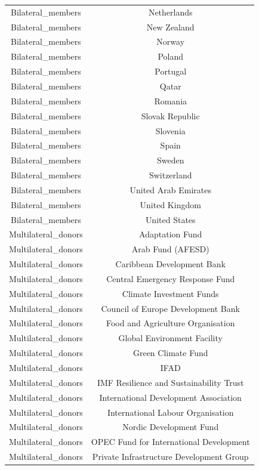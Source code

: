 \begin{longtable}{cc}
Bilateral\_members & Netherlands \\
Bilateral\_members & New Zealand \\
Bilateral\_members & Norway \\
Bilateral\_members & Poland \\
Bilateral\_members & Portugal \\
Bilateral\_members & Qatar \\
Bilateral\_members & Romania \\
Bilateral\_members & Slovak Republic \\
Bilateral\_members & Slovenia \\
Bilateral\_members & Spain \\
Bilateral\_members & Sweden \\
Bilateral\_members & Switzerland \\
Bilateral\_members & United Arab Emirates \\
Bilateral\_members & United Kingdom \\
Bilateral\_members & United States \\
Multilateral\_donors & Adaptation Fund \\
Multilateral\_donors & Arab Fund (AFESD) \\
Multilateral\_donors & Caribbean Development Bank \\
Multilateral\_donors & Central Emergency Response Fund \\
Multilateral\_donors & Climate Investment Funds \\
Multilateral\_donors & Council of Europe Development Bank \\
Multilateral\_donors & Food and Agriculture Organisation \\
Multilateral\_donors & Global Environment Facility \\
Multilateral\_donors & Green Climate Fund \\
Multilateral\_donors & IFAD \\
Multilateral\_donors & IMF Resilience and Sustainability Trust \\
Multilateral\_donors & International Development Association \\
Multilateral\_donors & International Labour Organisation \\
Multilateral\_donors & Nordic Development Fund \\
Multilateral\_donors & OPEC Fund for International Development \\
Multilateral\_donors & Private Infrastructure Development Group \\

\end{longtable}
